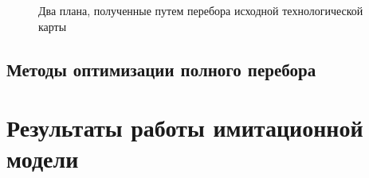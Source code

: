 \begin{figure}[H]
    \caption{Два плана, полученные путем перебора исходной технологической карты}
    \label{ris:Force}
\end{figure}

\subsection{Методы оптимизации полного перебора}

\section{Результаты работы имитационной модели}